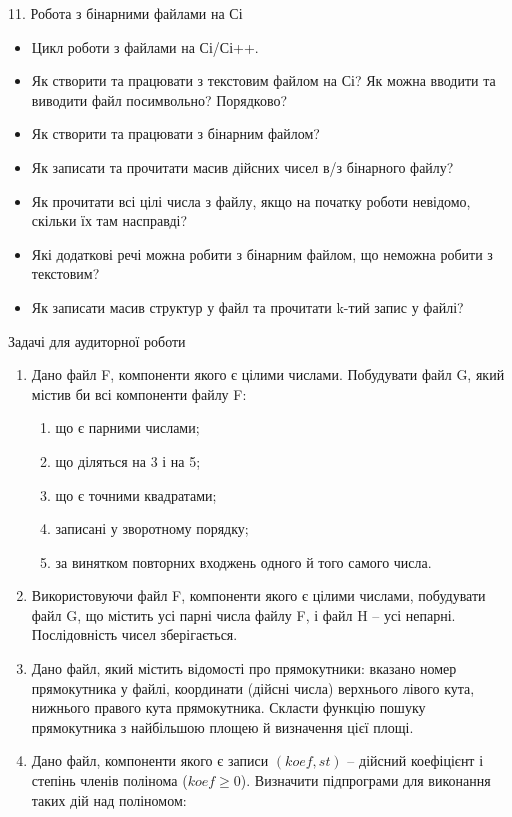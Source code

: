 \documentclass[]{article}
\makeatletter
\newcommand{\xslalph}[1]{\expandafter\@xslalph\csname c@#1\endcsname}
\newcommand{\@xslalph}[1]{%
    \ifcase#1\or а\or б\or в\or г\or д\or e\or є\or ж\or з\or i%
    \or й\or к\or л\or м\or н\or о\or п\or р\or с\or т%
    \or у\or ф\or х\or ц\or ч\or ш\or ю\or я\or аа\or бб\or вв%
    \else\@ctrerr\fi%
}
\makeatother
\begin{document}
\begin{enumerate}
\begin{enumerate}[label=\xslalph*)]
\begin{enumerate}
\begin{enumerate}[label=\xslalph*)]
11. Робота з бінарними файлами на Сі

\begin{itemize}
\item
  Цикл роботи з файлами на Сі/Сі++.
\item
  Як створити та працювати з текстовим файлом на Сі? Як можна вводити та
  виводити файл посимвольно? Порядково?
\item
  Як створити та працювати з бінарним файлом?
\item
  Як записати та прочитати масив дійсних чисел в/з бінарного файлу?
\item
  Як прочитати всі цілі числа з файлу, якщо на початку роботи невідомо,
  скільки їх там насправді?
\item
  Які додаткові речі можна робити з бінарним файлом, що неможна робити з
  текстовим?
\item
  Як записати масив структур у файл та прочитати k-тий запис у файлі?
\end{itemize}

Задачі для аудиторної роботи

\begin{enumerate}
\def\labelenumi{\arabic{enumi})}
\item
  Дано файл F, компоненти якого є цілими числами. Побудувати файл G,
  який містив би всі компоненти файлу F:
\begin{enumerate}[label=\xslalph*)]
\item
що є парними числами; 
\item
 що діляться на 3 і на 5;
\item
що є точними квадратами; 
\item
 записані у зворотному порядку;
\item
за винятком повторних входжень одного й того самого числа.
\end{enumerate}

\item
  Використовуючи файл F, компоненти якого є цілими числами, побудувати
  файл G, що містить усі парні числа файлу F, і файл H -- усі непарні.
  Послідовність чисел зберігається.
\item
  Дано файл, який містить відомості про прямокутники: вказано номер
  прямокутника у файлі, координати (дійсні числа) верхнього лівого кута,
  нижнього правого кута прямокутника. Скласти функцію пошуку
  прямокутника з найбільшою площею й визначення цієї площі.
\item
  Дано файл, компоненти якого є записи $(koef, st)$ -- дійсний коефіцієнт
  і степінь членів полінома ($koef \ge 0$). Визначити підпрограми для
  виконання таких дій над поліномом:



\end{enumerate}
\end{enumerate}
\end{enumerate}
\end{enumerate}
\end{enumerate}
\end{document}
